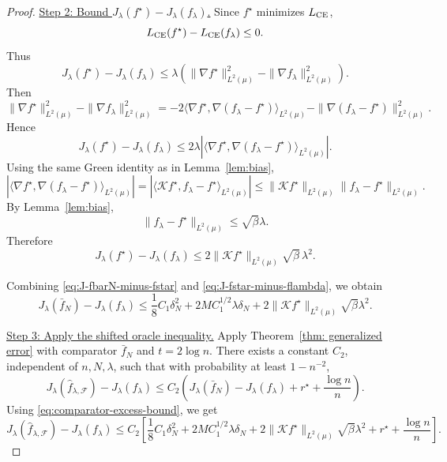 \documentclass[11pt]{article}
\theoremstyle{plain}
\theoremstyle{definition}
\theoremstyle{remark}
\newcommand{\proofstep}[1]{\par\medskip\noindent\uline{#1}}
\begin{document}
\begin{proof}
\proofstep{Step 2: Bound \(J_\lambda(f^\star)-J_\lambda(f_\lambda)\).}
Since \(f^\star\) minimizes \(L_{\rm CE}\),
\[
L_{\rm CE}(f^\star)-L_{\rm CE}(f_\lambda)\le 0.
\]
Thus
\[
J_\lambda(f^\star)-J_\lambda(f_\lambda)
\le
\lambda
\left(
\|\nabla f^\star\|_{L^2(\mu)}^2
-
\|\nabla f_\lambda\|_{L^2(\mu)}^2
\right).
\]
Then
\[
\|\nabla f^\star\|_{L^2(\mu)}^2
-
\|\nabla f_\lambda\|_{L^2(\mu)}^2
=
-2\langle\nabla f^\star,\nabla(f_\lambda-f^\star)\rangle_{L^2(\mu)}
-
\|\nabla(f_\lambda-f^\star)\|_{L^2(\mu)}^2.
\]
Hence
\[
J_\lambda(f^\star)-J_\lambda(f_\lambda)
\le
2\lambda
\left|
\langle\nabla f^\star,\nabla(f_\lambda-f^\star)\rangle_{L^2(\mu)}
\right|.
\]
Using the same Green identity as in Lemma~\ref{lem:bias},
\[
\left|
\langle\nabla f^\star,\nabla(f_\lambda-f^\star)\rangle_{L^2(\mu)}
\right|
=
\left|
\langle \mathcal K f^\star,f_\lambda-f^\star\rangle_{L^2(\mu)}
\right|
\le
\|\mathcal K f^\star\|_{L^2(\mu)}
\|f_\lambda-f^\star\|_{L^2(\mu)}.
\]
By Lemma~\ref{lem:bias},
\[
\|f_\lambda-f^\star\|_{L^2(\mu)}
\le
\sqrt{\beta}\lambda.
\]
Therefore
\begin{equation}
\label{eq:J-fstar-minus-flambda}
J_\lambda(f^\star)-J_\lambda(f_\lambda)
\le
2\|\mathcal K f^\star\|_{L^2(\mu)}\sqrt{\beta}\,\lambda^2.
\end{equation}

Combining \eqref{eq:J-fbarN-minus-fstar} and
\eqref{eq:J-fstar-minus-flambda}, we obtain
\begin{equation}
\label{eq:comparator-excess-bound}
J_\lambda(\bar f_N)-J_\lambda(f_\lambda)
\le
\frac18 C_1\delta_N^2
+
2M C_1^{1/2}\lambda\delta_N
+
2\|\mathcal K f^\star\|_{L^2(\mu)}\sqrt{\beta}\lambda^2.
\end{equation}

\proofstep{Step 3: Apply the shifted oracle inequality.}
Apply Theorem~\ref{thm: generalized error} with comparator \(\bar f_N\)
and \(t=2\log n\). There exists a constant \(C_2\), independent of
\(n,N,\lambda\), such that with probability at least \(1-n^{-2}\),
\[
J_\lambda(\widehat f_{\lambda,\mathcal F})
-
J_\lambda(f_\lambda)
\le
C_2
\left(
J_\lambda(\bar f_N)-J_\lambda(f_\lambda)+r^\star+\frac{\log n}{n}
\right).
\]
Using \eqref{eq:comparator-excess-bound}, we get
\begin{equation}
\label{eq:excess-after-clean-oracle}
J_\lambda(\widehat f_{\lambda,\mathcal F})
-
J_\lambda(f_\lambda)
\le
C_2
\left[
\frac18 C_1\delta_N^2
+
2M C_1^{1/2}\lambda\delta_N
+
2\|\mathcal K f^\star\|_{L^2(\mu)}\sqrt{\beta}\lambda^2
+
r^\star+\frac{\log n}{n}
\right].
\end{equation}


\end{proof}
\end{document}

